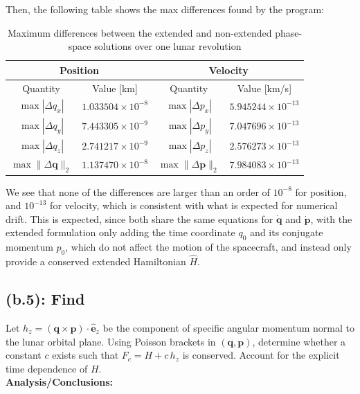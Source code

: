 \documentclass[titlepage]{article}
\begin{document}
\begin{mdframed}[linewidth=1pt, innertopmargin=10pt, innerbottommargin=10pt]
	Then, the following table shows the max differences found by the program:
	\begin{table}[H]
		\centering
		\caption{Maximum differences between the extended and non-extended phase-space solutions over one lunar revolution}
		\label{tab:b4_differences}
		\begin{tabular}{|c|c|c|c|}
			\hline
			\multicolumn{2}{|c|}{Position} & \multicolumn{2}{c|}{Velocity} \\
			\hline
			Quantity & Value [km] & Quantity & Value [km/s] \\
			\hline
			$\max|\Delta q_x|$ & $1.033504\times10^{-8}$ & $\max|\Delta p_x|$ & $5.945244\times10^{-13}$ \\
			\hline
			$\max|\Delta q_y|$ & $7.443305\times10^{-9}$ & $\max|\Delta p_y|$ & $7.047696\times10^{-13}$ \\
			\hline
			$\max|\Delta q_z|$ & $2.741217\times10^{-9}$ & $\max|\Delta p_z|$ & $2.576273\times10^{-13}$ \\
			\hline
			$\max\|\Delta\boldsymbol{q}\|_2$ & $1.137470\times10^{-8}$ & $\max\|\Delta\boldsymbol{p}\|_2$ & $7.984083\times10^{-13}$ \\
			\hline
		\end{tabular}
	\end{table}
	We see that none of the differences are larger than an order of $10^{-8}$ for position, and $10^{-13}$ for velocity, which is consistent with what is expected for numerical drift. This is expected, since both share the same equations for $\dot{\boldsymbol{q}}$ and $\dot{\boldsymbol{p}}$, with the extended formulation only adding the time coordinate $q_0$ and its conjugate momentum $p_0$, which do not affect the motion of the spacecraft, and instead only provide a conserved extended Hamiltonian $\widehat{H}$.
\end{mdframed}

\subsection*{(b.5): Find}

Let $h_z=(\boldsymbol{q}\times\boldsymbol{p})\cdot\hat{\boldsymbol{e}}_z$ be the component of specific angular momentum normal to the lunar orbital plane. Using Poisson brackets in $(\boldsymbol{q},\boldsymbol{p})$, determine whether a constant $c$ exists such that $F_c=H+c\,h_z$ is conserved. Account for the explicit time dependence of $H$. \\

\textbf{Analysis/Conclusions:}\\
\end{document}
